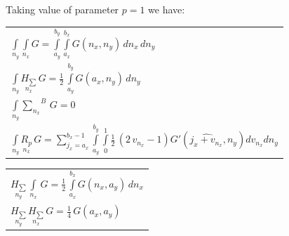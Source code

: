 \documentclass[twoside, 10pt]{article}
\def\myvspacebeforesubsection{-2.0mm}
\def\myvspaceaftersubsection{-2.5mm}
\begin{document}
\begin{multicols}{2}

\vspace{\myvspacebeforesubsection}
    \subsection*{} \label{summary-of-eulermaclaurin-2d}
\vspace{\myvspaceaftersubsection}


Taking value of parameter \(p = 1\) we have:

    \begin{center}
\begin{tabular}{ l }

$\int\limits_{n_y}^{} \int\limits_{n_x}^{} G = \int\limits_{a_{y}}^{b_{y}} \int\limits_{a_{x}}^{b_{x}} G\left(n_{x}, n_{y}\right)\,{d n_{x}}\,{d n_{y}}$ \\

$\int\limits_{n_y}^{} \underset{n_x}{H_{\sum}}\,G = \frac{1}{2} \, \int\limits_{a_{y}}^{b_{y}} G\left(a_{x}, n_{y}\right)\,{d n_{y}}$ \\

$\int\limits_{n_y}^{} {\sum\limits_{n_x}^{}}^{B}\,G = 0$ \\

$\int\limits_{n_y}^{} \underset{n_x}{R_{p}}\,G = {\sum\limits_{j_{x}=a_{x}}^{b_{x} - 1} \int\limits_{a_{y}}^{b_{y}} \int\limits_{0}^{1} \frac{1}{2} \, {\left(2 \, v_{n_{x}} - 1\right)} G'\left(\widehat{j_{x} + v_{n_{x}}}, n_{y}\right){d v_{n_{x}}}{d n_{y}}}$ \\


\end{tabular}
\end{center}

    \begin{center}
\begin{tabular}{ l }


$\underset{n_y}{H_{\sum}}\,\int\limits_{n_x}^{}\,G = \frac{1}{2} \, \int\limits_{a_{x}}^{b_{x}} G\left(n_{x}, a_{y}\right)\,{d n_{x}}$ \\

$\underset{n_y}{H_{\sum}}\,\underset{n_x}{H_{\sum}}\,G = \frac{1}{4} \, G\left(a_{x}, a_{y}\right)$ \\


\end{tabular}
\end{center}
\end{multicols}
\end{document}
